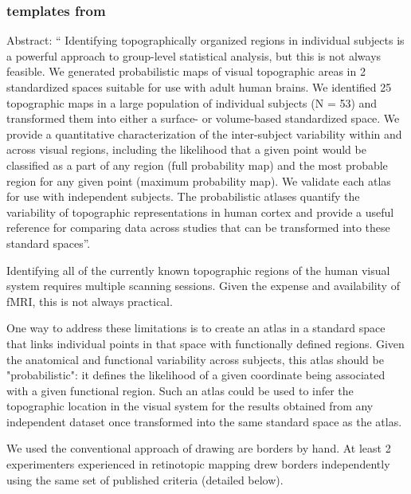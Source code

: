 \subsubsection{templates from \citet{wang2015probabilistic}}



Abstract: `` Identifying topographically organized regions in individual
subjects is a powerful approach to group-level statistical analysis, but this is
not always feasible.
%
We generated probabilistic maps of visual topographic areas in 2 standardized
spaces suitable for use with adult human brains.
%
We identified 25 topographic maps in a large population of individual subjects
(N = 53) and transformed them into either a surface- or volume-based
standardized space.
%
We provide a quantitative characterization of the inter-subject variability
within and across visual regions, including the likelihood that a given point
would be classified as a part of any region (full probability map) and the most
probable region for any given point (maximum probability map).
%
We validate each atlas for use with independent subjects.
%
The probabilistic atlases quantify the variability of topographic
representations in human cortex and provide a useful reference for comparing
data across studies that can be transformed into these standard spaces''.


Identifying all of the currently known topographic regions of the
human visual system requires multiple scanning sessions. Given the expense and
availability of fMRI, this is not always practical.

One way to address these limitations is to create an atlas in a standard space
that links individual points in that space with functionally defined regions.
%
Given the anatomical and functional variability across subjects, this atlas
should be "probabilistic": it defines the likelihood of a given coordinate being
associated with a given functional region.
%
Such an atlas could be used to infer the topographic location in the visual
system for the results obtained from any independent dataset once transformed
into the same standard space as the atlas.

We used the conventional approach of drawing are borders by hand.
%
At least 2 experimenters experienced in retinotopic mapping drew borders
independently using the same set of published criteria (detailed below).

